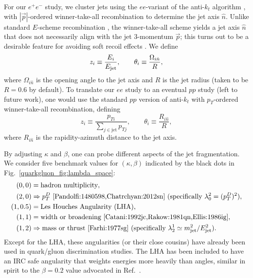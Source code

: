 \documentclass[11pt]{cernrep}
\begin{document}
For our $e^+ e^-$ study, we cluster jets using the $ee$-variant of the
anti-$k_t$ algorithm \cite{Cacciari:2008gp}, with $|\vec{p}|$-ordered
winner-take-all recombination
\cite{Larkoski:2014uqa,Bertolini:2013iqa,Salam:WTAUnpublished} to
determine the jet axis $\hat{n}$.  Unlike standard $E$-scheme
recombination \cite{Blazey:2000qt}, the winner-take-all scheme yields
a jet axis $\hat{n}$ that does not necessarily align with the jet
3-momentum $\vec{p}$; this turns out to be a desirable feature
for avoiding soft recoil effects
\cite{Larkoski:2013eya,Larkoski:2014uqa,Catani:1992jc,Dokshitzer:1998kz,Banfi:2004yd}.
We define
\begin{equation}
z_i \equiv \frac{E_i}{E_{\rm jet}}, \qquad \theta_i \equiv \frac{\Omega_{i \hat{n}}}{R},
\end{equation}
where $\Omega_{i \hat{n}}$ is the opening angle to the jet axis and $R$ is the jet radius (taken to be $R = 0.6$ by default).  To translate our $ee$ study to an eventual $pp$ study (left to future work), one would use the standard $pp$ version of anti-$k_t$ with $p_T$-ordered winner-take-all recombination, defining
\begin{equation}
z_i \equiv \frac{p_{Ti}}{\sum_{j \in \text{jet}} p_{Tj}}, \qquad \theta_i \equiv \frac{R_{i \hat{n}}}{R},
\end{equation}
where $R_{i \hat{n}}$ is the rapidity-azimuth distance to the jet axis.



By adjusting $\kappa$ and $\beta$, one can probe different aspects of the jet fragmentation.  We consider five benchmark values for $(\kappa, \beta)$ indicated by the black dots in Fig.~\ref{quarkgluon_fig:lambda_space}:
\begin{equation}
\label{quarkgluon_eq:benchmarkang}
\begin{aligned}
(0,0) &= \text{hadron multiplicity},\\
(2,0) &\Rightarrow p_T^D \text{  \cite{Pandolfi:1480598,Chatrchyan:2012sn} (specifically $\lambda^{2}_{0} = (p_T^D)^2$)},\\
(1,0.5) & = \text{Les Houches Angularity (LHA)},\\
(1,1) &= \text{width or broadening \cite{Catani:1992jc,Rakow:1981qn,Ellis:1986ig}},\\
(1,2) & \Rightarrow \text{mass or thrust \cite{Farhi:1977sg}
  (specifically $\lambda^{1}_{2} \simeq m_{\rm jet}^2 / E_{\rm
    jet}^2$)}.
\end{aligned}
\end{equation}
Except for the LHA, these angularities (or their close cousins) have already been used in quark/gluon discrimination studies.  The LHA has been included to have an IRC safe angularity that weights energies more heavily than angles, similar in spirit to the $\beta = 0.2$ value advocated in Ref.~\cite{Larkoski:2013eya}.
\end{document}
